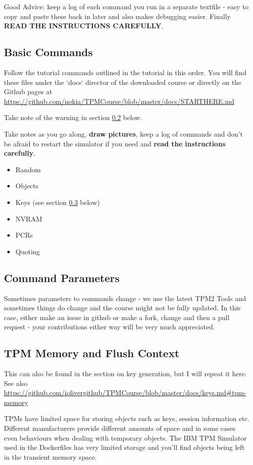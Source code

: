 \documentclass[11pt,a4paper]{article}
\begin{document}
Good Advice: keep a log of each command you run in a separate textfile - easy to copy and paste these back in later and also makes debugging easier. Finally \textbf{READ THE INSTRUCTIONS CAREFULLY}.


\subsection{Basic Commands}
Follow the tutorial commands outlined in the tutorial in this order. You will find these files under the `docs` director of the downloaded course or directly on the Github pages at \url{https://github.com/nokia/TPMCourse/blob/master/docs/STARTHERE.md}

Take note of the warning in section \ref{commandparameters} below.

Take notes as you go along, \textbf{draw pictures}, keep a log of commands and don't be afraid to restart the simulator if you need and \textbf{read the instructions carefully}.

\begin{itemize}
\item Random
\item Objects
\item Keys  (see section \ref{flush} below)
\item NVRAM
\item PCRs
\item Quoting
\end{itemize}

\subsection{Command Parameters}\label{commandparameters}
Sometimes parameters to commands change - we use the latest TPM2 Tools and sometimes things do change and the course might not be fully updated. In this case, either make an issue in github or make a fork, change and then a pull request - your contributions either way will be very much appreciated.


\subsection{TPM Memory and Flush Context}\label{flush}
This can also be found in the section on key generation, but I will repeat it here. See also \url{https://github.com/iolivergithub/TPMCourse/blob/master/docs/keys.md#tpm-memory}

TPMs have limited space for storing objects such as keys, session information etc. Different manufacturers provide different amounts of space and in some cases even behaviours when dealing with temporary objects. The IBM TPM Simulator used in the Dockerfiles has very limited storage and you'll find objects being left in the transient memory space.
\end{document}
